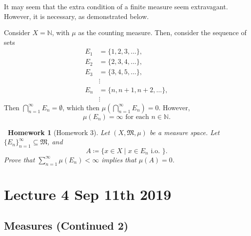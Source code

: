 \documentclass[notoc,notitlepage]{tufte-book}
\newtheorem*{homework}{\faCogs\ Homework}
\begin{document}
\begin{remark}
  It may seem that the extra condition of a finite measure
  seem extravagant. However, it is necessary, as demonstrated below.

  Consider $X = \mathbb{N}$, with $\mu$ as the counting measure.
  Then, consider the sequence of sets
  \begin{align*}
    E_1 &= \{ 1, 2, 3, \ldots \}, \\
    E_2 &= \{ 2, 3, 4, \ldots \}, \\
    E_3 &= \{ 3, 4, 5, \ldots \}, \\
       &\vdots \\
    E_n &= \{ n, n + 1, n + 2, \ldots \}, \\
       &\vdots
  \end{align*}
  Then $\bigcap_{n=1}^{\infty} E_n = \emptyset$, which then
  $\mu \left( \bigcap_{n=1}^{\infty} E_n \right) = 0$.
  However,
  \begin{equation*}
    \mu(E_n) = \infty \text{ for each } n \in \mathbb{N}.
  \end{equation*}
\end{remark}

\begin{homework}[Homework 3]\label{homework:3}
  Let $(X, \mathfrak{M}, \mu)$ be a measure space.
  Let $\{ E_n \}_{n=1}^{\infty} \subseteq \mathfrak{M}$, and
  \begin{equation*}
    A \coloneqq \{ x \in X \mid x \in E_n \text{ i.o. } \}.
  \end{equation*}
  Prove that $\sum_{n=1}^{\infty} \mu(E_n) < \infty$
  implies that $\mu(A) = 0$.
\end{homework}



\chapter{Lecture 4 Sep 11th 2019}%
\label{chp:lecture_4_sep_11th_2019}

\section{Measures (Continued 2)}%
\label{sec:measures_continued_2}
\end{document}
